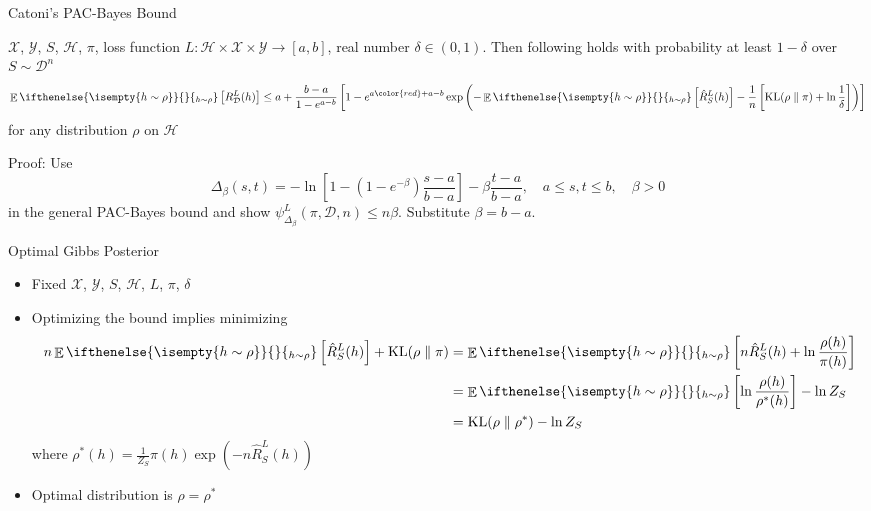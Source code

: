 \documentclass[aspectratio=169]{beamer}
\DeclareMathOperator*{\KLOp}{KL}
\DeclareMathOperator*{\EvOp}{\mathbb{E}}
\newcommand{\CD}{\mathcal{D}}
\newcommand{\CH}{\mathcal{H}}
\newcommand{\CX}{\mathcal{X}}
\newcommand{\CY}{\mathcal{Y}}
\newcommand*{\KL}[2]{\KLOp(#1\parallel#2)}
\newcommand*{\Ev}[2][]{%
  \mathchoice{%
    \EvOp\ifthenelse{\isempty{#1}}{}{_{#1}}\left[#2\right]%
  }{%
    \EvOp\ifthenelse{\isempty{#1}}{}{_{#1}}[#2]%
  }{%
    \EvOp\ifthenelse{\isempty{#1}}{}{_{#1}}[#2]%
  }{%
    \EvOp\ifthenelse{\isempty{#1}}{}{_{#1}}[#2]%
  }%
}
\begin{document}
\begin{frame}{Catoni's PAC-Bayes Bound}
  \begin{theorem}
    $\CX$, $\CY$, $S$, $\CH$, $\pi$, loss function $L : \CH \times \CX \times
    \CY \to [a, b]$, real number $\delta \in (0, 1)$.  Then following holds with
    probability at least $1 - \delta$ over $S \sim \CD^n$
    {
      \small
      \begin{equation*}
        \Ev[h \sim \rho]{R_\CD^L(h)} \leq a + \frac{b - a}{1 - e^{a - b}}\left[1
        - e^{a {\color{red} + a - b}} \exp\left(- \Ev[h \sim
        \rho]{\hat{R}_S^L(h)} - \frac{1}{n} \left[\KL{\rho}{\pi} +
        \ln\frac{1}{\delta}\right]\right)\right]
      \end{equation*}
    }
    for any distribution $\rho$ on $\CH$
  \end{theorem}
  
  Proof: Use
  \begin{equation*}
    \Delta_\beta(s, t) = - \ln \left[1 - (1 - e^{-\beta}) \frac{s - a}{b -
    a}\right] - \beta \frac{t - a}{b - a}, \quad a \leq s, t \leq b, \quad \beta
    > 0
  \end{equation*}
  in the general PAC-Bayes bound and show $\psi_{\Delta_\beta}^L(\pi, \CD, n)
  \leq n \beta$. Substitute $\beta = b - a$.
\end{frame}

\begin{frame}{Optimal Gibbs Posterior}
  \begin{itemize}
    \item
      Fixed $\CX$, $\CY$, $S$, $\CH$, $L$, $\pi$, $\delta$
    \item
      Optimizing the bound implies minimizing
      \begin{equation*}
        \begin{split}
          n \Ev[h \sim \rho]{\hat{R}_S^L(h)} + \KL{\rho}{\pi}
          &= \Ev[h \sim \rho]{n \hat{R}_S^L(h) + \ln\frac{\rho(h)}{\pi(h)}} \\
          &= \Ev[h \sim \rho]{\ln\frac{\rho(h)}{\rho^*(h)}} - \ln Z_S \\
          &= \KL{\rho}{\rho^*} - \ln Z_S
        \end{split}
      \end{equation*}
      where $\rho^*(h) = \frac{1}{Z_S} \pi(h) \exp(-n \hat{R}_S^L(h))$
    \item
      Optimal distribution is $\rho = \rho^*$
  \end{itemize}
\end{frame}
\end{document}
